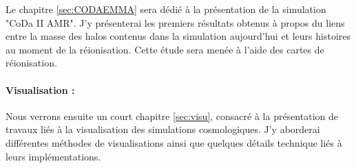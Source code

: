 Le chapitre \ref{sec:CODAEMMA} sera dédié à la présentation de la simulation "CoDa II AMR". %
J'y présenterai les premiers résultats obtenus à propos du liens entre la masse des halos contenus dans la simulation aujourd'hui et leurs histoires au moment de la réionisation.
Cette étude sera menée à l'aide des cartes de réionisation.

\paragraph{Visualisation : }
Nous verrons ensuite un court chapitre  \ref{sec:visu}, consacré à la présentation de travaux liés à la visualisation des simulations cosmologiques.
J'y aborderai différentes méthodes de visualisations ainsi que quelques détails technique liés à leurs implémentations.







